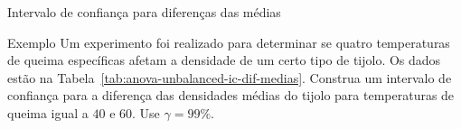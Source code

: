 \documentclass[8pt]{beamer}
\begin{document}
\begin{frame}{Intervalo de confiança para diferenças das médias}

\begin{block}{Exemplo}
	Um experimento foi realizado para determinar se quatro temperaturas de queima específicas afetam a densidade de um certo tipo de tijolo. Os dados estão na Tabela~\ref{tab:anova-unbalanced-ic-dif-medias}. Construa um intervalo de confiança para a diferença das densidades médias do tijolo para temperaturas de queima igual a $40$ e $60$. Use $\gamma = 99\%$.
	\begin{table}[htbp]
		\centering
		\caption{Informações do experimento.}
		\label{tab:anova-unbalanced-ic-dif-medias}
	\end{table}
\end{block}

\end{frame}
\end{document}
